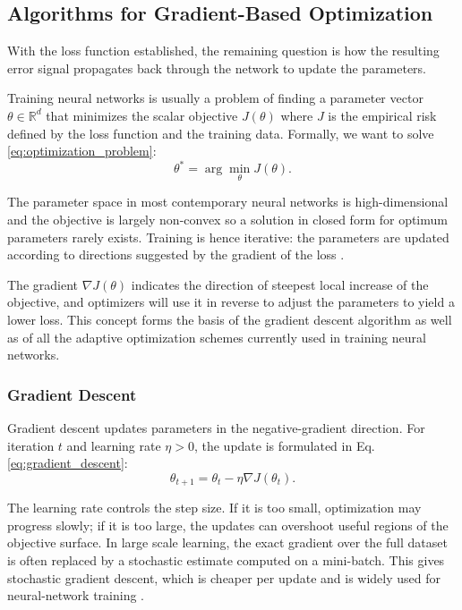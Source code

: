 \subsection{Algorithms for Gradient-Based Optimization}
\label{sec:gradient_based_optimization}
With the loss function established, the remaining question is how the resulting error signal propagates back through the network to update the parameters.

Training neural networks is usually a problem of finding a parameter vector $\theta \in \mathbb{R}^{d}$ that minimizes the scalar objective $J(\theta)$ where $J$ is the empirical risk defined by the loss function and the training data. Formally, we want to solve \eqref{eq:optimization_problem}:
\begin{equation}
    \theta^* = \arg\min_{\theta} J(\theta).
    \label{eq:optimization_problem}
\end{equation}

The parameter space in most contemporary neural networks is high-dimensional and the objective is largely non-convex so a solution in closed form for optimum parameters rarely exists. Training is hence iterative: the parameters are updated according to directions suggested by the gradient of the loss \cite{Bottou2018}.

The gradient $\nabla J(\theta)$ indicates the direction of steepest local increase of the objective, and optimizers will use it in reverse to adjust the parameters to  yield a lower loss. This concept forms the basis of the gradient descent algorithm as well as of all the adaptive optimization schemes currently used in training neural networks.

\subsubsection{Gradient Descent}

Gradient descent updates parameters in the negative-gradient direction. For iteration $t$ and learning rate $\eta>0$, the update is formulated in Eq.\eqref{eq:gradient_descent}:
\begin{equation}
    \label{eq:gradient_descent}
    \theta_{t+1} = \theta_t - \eta \nabla J(\theta_t).
\end{equation}

The learning rate controls the step size. If it is too small, optimization may progress slowly; if it is too large, the updates can overshoot useful regions of the objective surface. In large scale learning, the exact gradient over the full dataset is often replaced by a stochastic estimate computed on a mini-batch. This gives stochastic gradient descent, which is cheaper per update and is widely used for neural-network training \cite{Bottou2018}.

